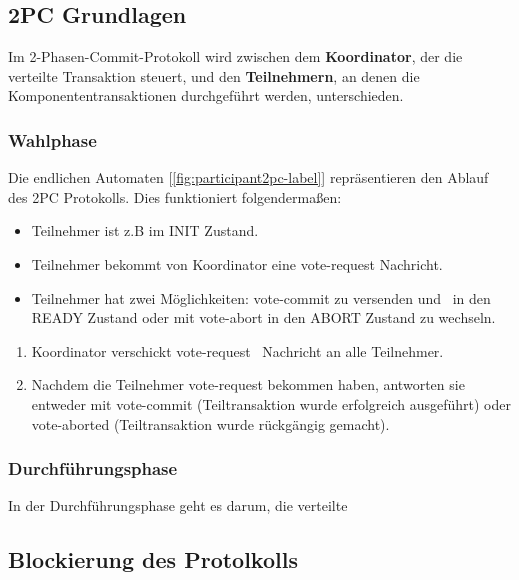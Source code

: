 \documentclass[11pt]{scrartcl}       %
\begin{document}
\subsection{2PC Grundlagen}
Im 2-Phasen-Commit-Protokoll wird zwischen 
dem \textbf{Koordinator}, der die verteilte Transaktion steuert, und den \textbf{Teilnehmern}, an denen die Komponententransaktionen durchgeführt werden, unterschieden.

\subsubsection{Wahlphase}
Die endlichen Automaten [\ref{fig:participant2pc-label}] repräsentieren
den Ablauf des 2PC Protokolls. Dies funktioniert folgendermaßen:
\begin{itemize}
	\item Teilnehmer ist z.B im INIT Zustand.
	\item Teilnehmer bekommt von Koordinator eine vote-request Nachricht.
	\item Teilnehmer hat zwei Möglichkeiten: vote-commit zu versenden und \
	in den READY Zustand oder mit vote-abort in den ABORT Zustand zu wechseln.
\end{itemize}

\begin{enumerate}
	\item Koordinator verschickt vote-request \
	Nachricht an alle Teilnehmer. 
	\item Nachdem die Teilnehmer vote-request bekommen haben, 
	antworten sie entweder mit vote-commit 
	(Teiltransaktion wurde erfolgreich ausgeführt) 
	oder \mbox{vote-aborted} (Teiltransaktion wurde
	 rückgängig gemacht).
\end{enumerate}
\subsubsection{Durchführungsphase}
In der Durchführungsphase geht es darum, die verteilte 

\subsection{Blockierung des Protolkolls}
\label{sec:blocking}
\end{document}
